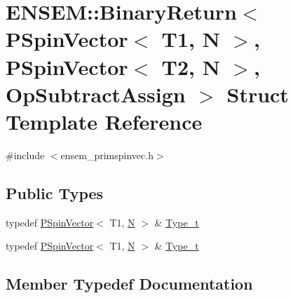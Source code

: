 \hypertarget{structENSEM_1_1BinaryReturn_3_01PSpinVector_3_01T1_00_01N_01_4_00_01PSpinVector_3_01T2_00_01N_01_4_00_01OpSubtractAssign_01_4}{}\section{E\+N\+S\+EM\+:\+:Binary\+Return$<$ P\+Spin\+Vector$<$ T1, N $>$, P\+Spin\+Vector$<$ T2, N $>$, Op\+Subtract\+Assign $>$ Struct Template Reference}
\label{structENSEM_1_1BinaryReturn_3_01PSpinVector_3_01T1_00_01N_01_4_00_01PSpinVector_3_01T2_00_01N_01_4_00_01OpSubtractAssign_01_4}


{\ttfamily \#include $<$ensem\+\_\+primspinvec.\+h$>$}

\subsection*{Public Types}
\begin{DoxyCompactItemize}
\item 
typedef \mbox{\hyperlink{classENSEM_1_1PSpinVector}{P\+Spin\+Vector}}$<$ T1, \mbox{\hyperlink{operator__name__util_8cc_a7722c8ecbb62d99aee7ce68b1752f337}{N}} $>$ \& \mbox{\hyperlink{structENSEM_1_1BinaryReturn_3_01PSpinVector_3_01T1_00_01N_01_4_00_01PSpinVector_3_01T2_00_01N_01_4_00_01OpSubtractAssign_01_4_ad4376f3039608076cd33633bd9e22736}{Type\+\_\+t}}
\item 
typedef \mbox{\hyperlink{classENSEM_1_1PSpinVector}{P\+Spin\+Vector}}$<$ T1, \mbox{\hyperlink{operator__name__util_8cc_a7722c8ecbb62d99aee7ce68b1752f337}{N}} $>$ \& \mbox{\hyperlink{structENSEM_1_1BinaryReturn_3_01PSpinVector_3_01T1_00_01N_01_4_00_01PSpinVector_3_01T2_00_01N_01_4_00_01OpSubtractAssign_01_4_ad4376f3039608076cd33633bd9e22736}{Type\+\_\+t}}
\end{DoxyCompactItemize}


\subsection{Member Typedef Documentation}
\mbox{\label{structENSEM_1_1BinaryReturn_3_01PSpinVector_3_01T1_00_01N_01_4_00_01PSpinVector_3_01T2_00_01N_01_4_00_01OpSubtractAssign_01_4_ad4376f3039608076cd33633bd9e22736}} 

